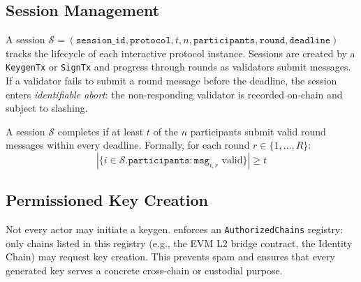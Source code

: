 \subsection{Session Management}

A session $\mathcal{S} = (\texttt{session\_id}, \texttt{protocol}, t, n, \texttt{participants}, \texttt{round}, \texttt{deadline})$ tracks the lifecycle of each interactive protocol instance. Sessions are created by a \texttt{KeygenTx} or \texttt{SignTx} and progress through rounds as validators submit messages. If a validator fails to submit a round message before the deadline, the session enters \emph{identifiable abort}: the non-responding validator is recorded on-chain and subject to slashing.

\begin{definition}
A session $\mathcal{S}$ completes if at least $t$ of the $n$ participants submit valid round messages within every deadline. Formally, for each round $r \in \{1, \ldots, R\}$:
\[
|\{i \in \mathcal{S}.\texttt{participants} : \texttt{msg}_{i,r} \text{ valid} \}| \geq t
\]
\end{definition}

\subsection{Permissioned Key Creation}

Not every actor may initiate a keygen. \TChain{} enforces an \texttt{AuthorizedChains} registry: only chains listed in this registry (e.g., the EVM L2 bridge contract, the Identity Chain) may request key creation. This prevents spam and ensures that every generated key serves a concrete cross-chain or custodial purpose.


